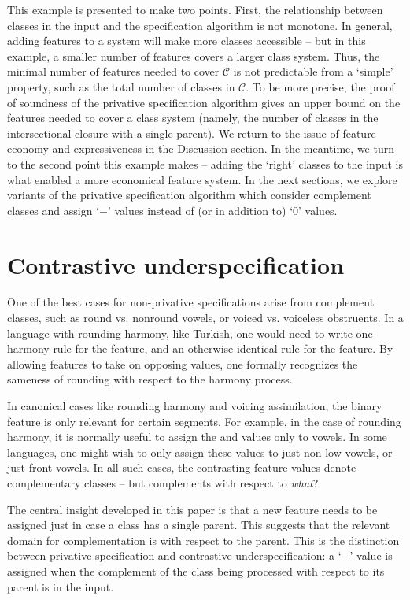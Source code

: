 \documentclass[11pt, oneside]{article}   	%
\begin{document}
This example is presented to make two points. First, the relationship between classes in the input and the specification algorithm is not monotone. In general, adding features to a system will make more classes accessible -- but in this example, a smaller number of features covers a larger class system. Thus, the minimal number of features needed to cover $\mathcal C$ is not predictable from a `simple' property, such as the total number of classes in $\mathcal C$. To be more precise, the proof of soundness of the privative specification algorithm gives an upper bound on the features needed to cover a class system (namely, the number of classes in the intersectional closure with a single parent). We return to the issue of feature economy and expressiveness in the Discussion section. In the meantime, we turn to the second point this example makes -- adding the `right' classes to the input is what enabled a more economical feature system. In the next sections, we explore variants of the privative specification algorithm which consider complement classes and assign `$-$' values instead of (or in addition to) `$0$' values. 

\section{Contrastive underspecification}

One of the best cases for non-privative specifications arise from complement classes, such as round vs. nonround vowels, or voiced vs. voiceless obstruents. In a language with rounding harmony, like Turkish, one would need to write one harmony rule for the  feature, and an otherwise identical rule for the  feature. By allowing features to take on opposing values, one formally recognizes the sameness of rounding with respect to the harmony process.

In canonical cases like rounding harmony and voicing assimilation, the binary feature is only relevant for certain segments. For example, in the case of rounding harmony, it is normally useful to assign the  and  values only to vowels. In some languages, one might wish to only assign these values to just non-low vowels, or just front vowels. In all such cases, the contrasting feature values denote complementary classes -- but complements with respect to \textit{what}?

The central insight developed in this paper is that a new feature needs to be assigned just in case a class has a single parent. This suggests that the relevant domain for complementation is with respect to the parent. This is the distinction between privative specification and contrastive underspecification: a `$-$' value is assigned when the complement of the class being processed with respect to its parent is in the input.
\end{document}

